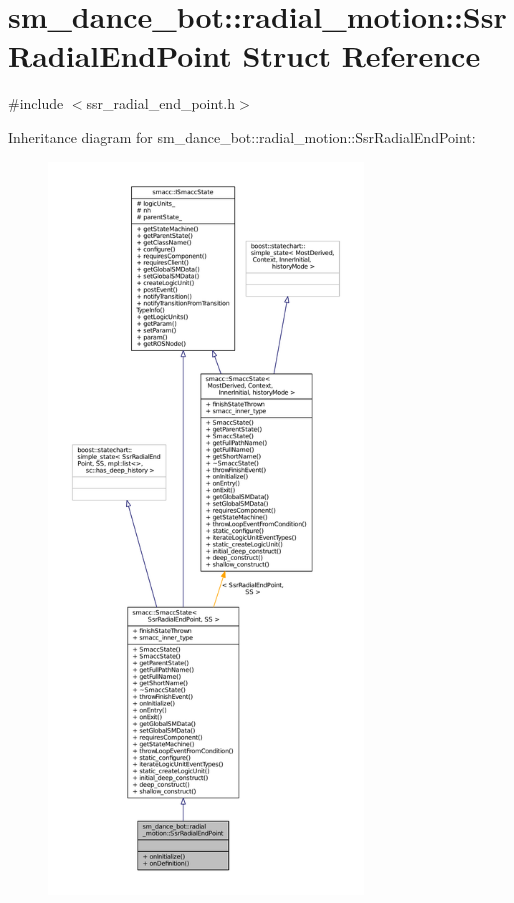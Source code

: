 \hypertarget{structsm__dance__bot_1_1radial__motion_1_1SsrRadialEndPoint}{}\section{sm\+\_\+dance\+\_\+bot\+:\+:radial\+\_\+motion\+:\+:Ssr\+Radial\+End\+Point Struct Reference}
\label{structsm__dance__bot_1_1radial__motion_1_1SsrRadialEndPoint}


{\ttfamily \#include $<$ssr\+\_\+radial\+\_\+end\+\_\+point.\+h$>$}



Inheritance diagram for sm\+\_\+dance\+\_\+bot\+:\+:radial\+\_\+motion\+:\+:Ssr\+Radial\+End\+Point\+:
\nopagebreak
\begin{figure}[H]
\begin{center}
\leavevmode
\includegraphics[height=550pt]{structsm__dance__bot_1_1radial__motion_1_1SsrRadialEndPoint__inherit__graph}
\end{center}
\end{figure}



